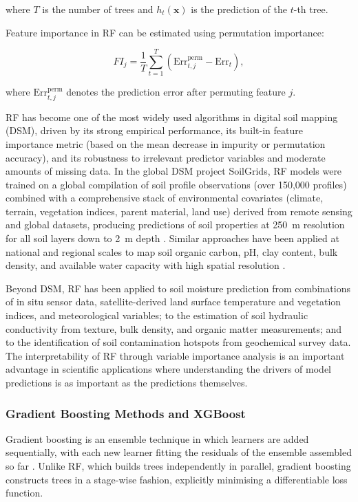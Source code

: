\documentclass[land,article,submit,pdftex,moreauthors]{Definitions/mdpi}
\numberwithin{equation}{section}
\begin{document}
where $T$ is the number of trees and $h_t(\mathbf{x})$ is the prediction of the $t$-th tree.

Feature importance in RF can be estimated using permutation importance:

\begin{equation}
FI_j=\frac{1}{T}\sum_{t=1}^{T}
\left(
\text{Err}_{t,j}^{\text{perm}}-\text{Err}_t
\right),
\end{equation}

where $\text{Err}_{t,j}^{\text{perm}}$ denotes the prediction error after permuting feature $j$.

RF has become one of the most widely used algorithms in digital soil mapping (DSM), driven by its strong empirical performance, its built-in feature importance metric (based on the mean decrease in impurity or permutation accuracy), and its robustness to irrelevant predictor variables and moderate amounts of missing data. In the global DSM project SoilGrids, RF models were trained on a global compilation of soil profile observations (over 150,000 profiles) combined with a comprehensive stack of environmental covariates (climate, terrain, vegetation indices, parent material, land use) derived from remote sensing and global datasets, producing predictions of soil properties at 250~m resolution for all soil layers down to 2~m depth \citep{hengl2017soilgrids250m}. Similar approaches have been applied at national and regional scales to map soil organic carbon, pH, clay content, bulk density, and available water capacity with high spatial resolution \citep{Lemenkova202502, Lemenkova202501}.

Beyond DSM, RF has been applied to soil moisture prediction from combinations of in situ sensor data, satellite-derived land surface temperature and vegetation indices, and meteorological variables; to the estimation of soil hydraulic conductivity from texture, bulk density, and organic matter measurements; and to the identification of soil contamination hotspots from geochemical survey data. The interpretability of RF through variable importance analysis is an important advantage in scientific applications where understanding the drivers of model predictions is as important as the predictions themselves.

\subsubsection{Gradient Boosting Methods and XGBoost}

Gradient boosting is an ensemble technique in which learners are added sequentially, with each new learner fitting the residuals of the ensemble assembled so far \citep{friedman2001greedy}. Unlike RF, which builds trees independently in parallel, gradient boosting constructs trees in a stage-wise fashion, explicitly minimising a differentiable loss function.
\end{document}
